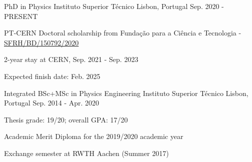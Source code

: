 
\begin{cventries}

\cventry
  {PhD in Physics}
  {Instituto Superior Técnico}
  {Lisbon, Portugal}
  {Sep. 2020 - PRESENT}
  {
    \begin{cvitems}
      \item {PT-CERN Doctoral scholarship from Fundação para a Ciência e Tecnologia - \href{https://doi.org/10.54499/SFRH/BD/150792/2020}{SFRH/BD/150792/2020}}
      \item {2-year stay at CERN, Sep. 2021 - Sep. 2023}
      \item {Expected finish date: Feb. 2025}
    \end{cvitems}
  }

  \cventry
    {Integrated BSc+MSc in Physics Engineering} %
    {Instituto Superior Técnico} %
    {Lisbon, Portugal} %
    {Sep. 2014 - Apr. 2020} %
    {
      \begin{cvitems} %
        \item {Thesis grade: 19/20; overall GPA: 17/20}
        \item {Academic Merit Diploma for the 2019/2020 academic year}
        \item {Exchange semester at RWTH Aachen (Summer 2017)}
      \end{cvitems}
    }



\end{cventries}